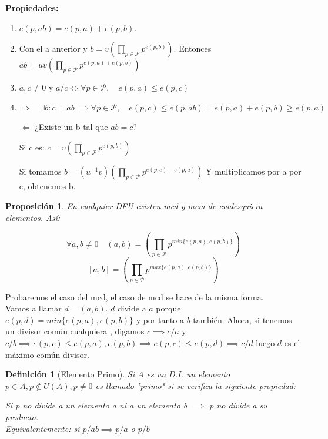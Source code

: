 \documentclass[11pt, a4paper, titlepage]{article}
\makeatletter
\renewenvironment{proof}[1][\proofname] {\vspace{-15pt}\par\pushQED{\qed}\normalfont\topsep6\p@\@plus6\p@\relax\trivlist\item[\hskip\labelsep\it#1\@addpunct{.}]\ignorespaces}{\popQED\endtrivlist\@endpefalse}
\theoremstyle{theorem-style}
\newtheorem*{nprop}{Proposición}
\theoremstyle{definition-style}
\newtheorem*{ndef}{Definición}
\theoremstyle{remark-style}
\theoremstyle{example-style}
\newenvironment{nlist}
{\begin{enumerate}
\renewcommand\labelenumi{(\emph{\roman{enumi})}}}
{\end{enumerate}}
\makeatother
\begin{document}
\textbf{Propiedades:}
\begin{nlist}
	\item $e(p,ab) = e(p,a) + e(p,b)$.\\
	
	\begin{proof}
	
	Con el a anterior y $b= v(\prod _{p \in \mathcal{P}}p^{e(p,b)})$. Entonces $ab = uv(\prod _{p \in \mathcal{P}}p^{e(p,a)+ e(p,b)})$
\end{proof}

\item $a,c \ne 0$ y $a/c \iff \forall p \in \mathcal{P}, \quad e(p,a) \leq e(p,c)$\\

\begin{proof}
	$\boxed{\Rightarrow} \quad \exists b: c =ab \implies \forall p \in \mathcal{P}, \quad e(p,c) \leq e(p,ab) = e(p,a)+e(p,b) \geq e(p,a) $
	
	$\boxed{\Leftarrow} $ ¿Existe un b tal que $ab= c$? 
	
	Si c es: $c = v(\prod _{p \in \mathcal{P}}p^{e(p,b)})$
	
	Si tomamos $b = (u^{-1}v)(\prod _{p \in \mathcal{P}}p^{e(p,c) - e(p,a)}) $ Y multiplicamos por a por c, obtenemos b.
\end{proof}
\end{nlist}

\begin{nprop}
En cualquier DFU existen mcd y mcm de cualesquiera elementos. Así:

\[
\forall a,b \ne 0 \quad (a,b) = (\prod _{p \in \mathcal{P}}p^{min\{e(p,a),e(p,b)\}})
\]
\[
[a,b] = (\prod _{p \in \mathcal{P}}p^{max\{e(p,a),e(p,b)\}})
\]
	
\end{nprop}
\begin{proof}
	Probaremos el caso del mcd, el caso de mcd se hace de la misma forma.\\
	Vamos a llamar $d=(a,b)$. $d$ divide a $a$ porque $e(p,d) = min \{e(p,a), e(p,b)\}$ y por tanto a $b$ también. Ahora, si tenemos un divisor común cualquiera , digamos $c \implies c/a$  y $c/b \implies e(p,c) \leq e(p,a),e(p,b) \implies e(p,c) \leq e(p,d) \implies c/d$ luego $d$ es el máximo común divisor.
\end{proof}

\begin{ndef}[Elemento Primo]
	Si $A$ es un D.I. un elemento $p\in A , p \notin U(A), p \ne 0$ es llamado "primo" si se verifica la siguiente propiedad:
	
	Si p no divide a un elemento a ni a un elemento b $\implies $ p no divide a su producto.\\
	Equivalentemente: si $p/ab \implies p/a$ o $p/b$  
	
\end{ndef}
\end{document}
